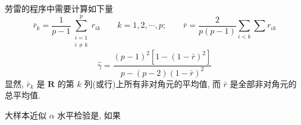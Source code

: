 劳雷的程序中需要计算如下量
\[
\bar{r}_k=\frac{1}{p-1}\sum_{\substack{i=1\\ i\neq k}}^{p}r_{ik}\qquad k=1,2,\cdots,p;\qquad
\bar{r}=\frac{2}{p(p-1)}\sum_{i<k}\sum r_{ik}
\]
\label{eq:8-34}
\begin{equation}
\hat{\gamma}=\frac{(p-1)^2[1-(1-\bar{r})^2]}{p-(p-2)(1-\bar{r})^2} \tag{8-34}
\end{equation}
显然, $\bar{r}_k$ 是 $\mathbf{R}$ 的第 $k$ 列(或行)上所有非对角元的平均值, 而 $\bar{r}$ 是全部非对角元的总平均值.

大样本近似 $\alpha$ 水平检验是, 如果
